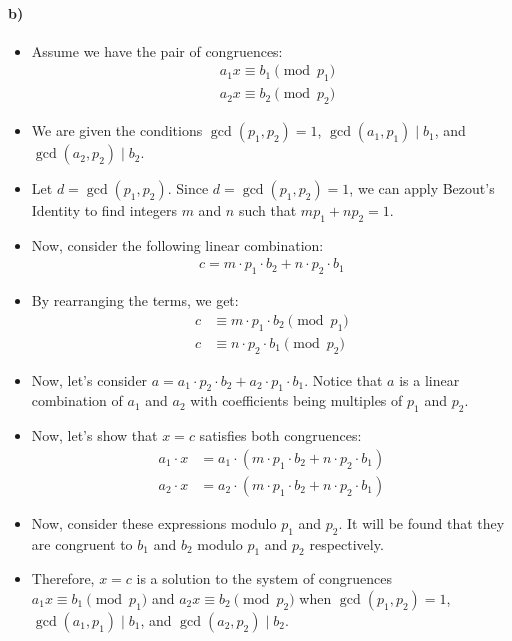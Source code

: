 \documentclass[12pt]{article}
\begin{document}
\paragraph*{b)}
\begin{itemize}
    \item Assume we have the pair of congruences:
    \begin{equation*}
        \begin{split}
            &a_1x \equiv b_1 \pmod{p_1} \\
            &a_2x \equiv b_2 \pmod{p_2}
        \end{split}
    \end{equation*}
    \item We are given the conditions $\gcd(p_1, p_2) = 1$, $\gcd(a_1, p_1) \mid b_1$, and $\gcd(a_2, p_2) \mid b_2$.
    \item Let $d = \gcd(p_1, p_2)$. Since $d = \gcd(p_1, p_2) = 1$, we can apply Bezout's Identity to find integers $m$ and $n$ such that $mp_1 + np_2 = 1$.
    \item Now, consider the following linear combination:
    \begin{equation*}
        \begin{split}
            c = m \cdot p_1 \cdot b_2 + n \cdot p_2 \cdot b_1
        \end{split}
    \end{equation*}
    \item By rearranging the terms, we get:
    \begin{equation*}
        \begin{split}
            c &\equiv m \cdot p_1 \cdot b_2 \pmod{p_1} \\
            c &\equiv n \cdot p_2 \cdot b_1 \pmod{p_2}
        \end{split}
    \end{equation*}
    \item Now, let's consider $a = a_1 \cdot p_2 \cdot b_2 + a_2 \cdot p_1 \cdot b_1$. Notice that $a$ is a linear combination of $a_1$ and $a_2$ with coefficients being multiples of $p_1$ and $p_2$.
    \item Now, let's show that $x = c$ satisfies both congruences:
    \begin{equation*}
        \begin{split}
            a_1 \cdot x &= a_1 \cdot (m \cdot p_1 \cdot b_2 + n \cdot p_2 \cdot b_1) \\
            a_2 \cdot x &= a_2 \cdot (m \cdot p_1 \cdot b_2 + n \cdot p_2 \cdot b_1)
        \end{split}
    \end{equation*}
    \item Now, consider these expressions modulo $p_1$ and $p_2$. It will be found that they are congruent to $b_1$ and $b_2$ modulo $p_1$ and $p_2$ respectively.
    \item Therefore, $x = c$ is a solution to the system of congruences $a_1x \equiv b_1 \pmod{p_1}$ and $a_2x \equiv b_2 \pmod{p_2}$ when $\gcd(p_1, p_2) = 1$, $\gcd(a_1, p_1) \mid b_1$, and $\gcd(a_2, p_2) \mid b_2$.
\end{itemize}{}
\end{document}
